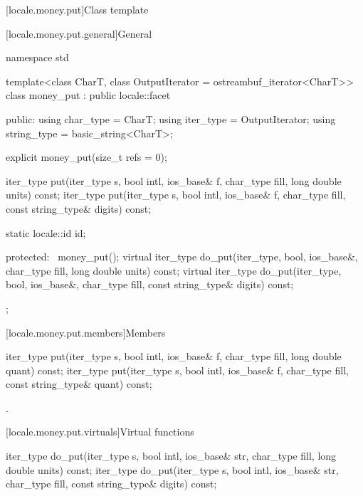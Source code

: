 [locale.money.put]{Class template }

[locale.money.put.general]{General}

%
\begin{codeblock}
namespace std {
  template<class CharT, class OutputIterator = ostreambuf_iterator<CharT>>
    class money_put : public locale::facet {
    public:
      using char_type   = CharT;
      using iter_type   = OutputIterator;
      using string_type = basic_string<CharT>;

      explicit money_put(size_t refs = 0);

      iter_type put(iter_type s, bool intl, ios_base& f,
                    char_type fill, long double units) const;
      iter_type put(iter_type s, bool intl, ios_base& f,
                    char_type fill, const string_type& digits) const;

      static locale::id id;

    protected:
      ~money_put();
      virtual iter_type do_put(iter_type, bool, ios_base&, char_type fill,
                               long double units) const;
      virtual iter_type do_put(iter_type, bool, ios_base&, char_type fill,
                               const string_type& digits) const;
    };
}
\end{codeblock}

[locale.money.put.members]{Members}

%
\begin{itemdecl}
iter_type put(iter_type s, bool intl, ios_base& f, char_type fill, long double quant) const;
iter_type put(iter_type s, bool intl, ios_base& f, char_type fill, const string_type& quant) const;
\end{itemdecl}

\begin{itemdescr}
\pnum
\returns
{}.
\end{itemdescr}

[locale.money.put.virtuals]{Virtual functions}

%
\begin{itemdecl}
iter_type do_put(iter_type s, bool intl, ios_base& str,
                 char_type fill, long double units) const;
iter_type do_put(iter_type s, bool intl, ios_base& str,
                 char_type fill, const string_type& digits) const;
\end{itemdecl}

